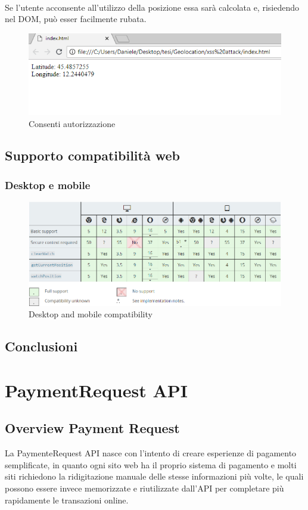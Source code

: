\documentclass[11pt ,a4paper , twoside , openright ]{article}
\begin{document}
\\
Se l'utente acconsente all'utilizzo della posizione essa sarà calcolata e, risiedendo nel DOM, può esser facilmente rubata.
\begin{figure}[h]
	\centering
	\includegraphics[width=1\linewidth]{Consenti}
	\caption{Consenti autorizzazione}
	\label{fig: Consenti autorizzazione}
\end{figure}
\clearpage
\subsection{Supporto compatibilità web}
\subsubsection{Desktop e mobile}
\begin{figure}[h]
	\centering
	\includegraphics[width=1\linewidth]{compatibility}
	\caption{Desktop and mobile compatibility}
	\label{fig: Desktop and mobile compatibility}
\end{figure}
\subsection{Conclusioni}
\newpage

\section{PaymentRequest API}

\subsection{Overview Payment Request}
La PaymenteRequest API nasce con l'intento di creare esperienze di pagamento semplificate, in quanto ogni sito web ha il proprio sistema di pagamento e molti siti richiedono la ridigitazione manuale delle stesse informazioni più volte, le quali possono essere invece memorizzate e riutilizzate dall'API per completare più rapidamente le transazioni online.
\end{document}
